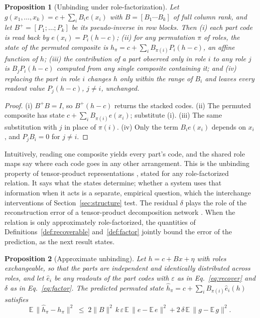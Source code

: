\documentclass[10pt]{article}
\theoremstyle{plain}
\newtheorem{proposition}{Proposition}
\theoremstyle{remark}
\begin{document}
\begin{proposition}[Unbinding under role-factorization]
\label{prop:systematic}
Let $g(x_1, \ldots, x_k) = c + \sum_i B_i e(x_i)$ with $B = [B_1 \cdots B_k]$ of full column rank, and let $B^{+} = [P_1; \ldots; P_k]$ be its pseudo-inverse in row blocks. Then (i) each part code is read back by $e(x_i) = P_i(h - c)$; (ii) for any permutation $\pi$ of roles, the state of the permuted composite is $h_\pi = c + \sum_i B_{\pi(i)} P_i (h - c)$, an affine function of $h$; (iii) the contribution of a part observed only in role $i$ to any role $j$ is $B_j P_i (h - c)$ computed from any single composite containing it; and (iv) replacing the part in role $i$ changes $h$ only within the range of $B_i$ and leaves every readout value $P_j(h - c)$, $j \ne i$, unchanged.
\end{proposition}

\begin{proof}
(i) $B^{+}B = I$, so $B^{+}(h - c)$ returns the stacked codes. (ii) The permuted composite has state $c + \sum_i B_{\pi(i)} e(x_i)$; substitute (i). (iii) The same substitution with $j$ in place of $\pi(i)$. (iv) Only the term $B_i e(x_i)$ depends on $x_i$, and $P_j B_i = 0$ for $j \neq i$.
\end{proof}

\noindent
Intuitively, reading one composite yields every part's code, and the shared role maps say where each code goes in any other arrangement. This is the unbinding property of tensor-product representations \citep{smolensky1990}, stated for any role-factorized relation. It says what the states determine; whether a system uses that information when it acts is a separate, empirical question, which the interchange interventions of Section~\ref{sec:structure} test. The residual $\delta$ plays the role of the reconstruction error of a tensor-product decomposition network \citep{mccoy2019}. When the relation is only approximately role-factorized, the quantities of Definitions~\ref{def:recoverable} and~\ref{def:factor} jointly bound the error of the prediction, as the next result states.

\begin{proposition}[Approximate unbinding]
\label{prop:approx}
Let $h = c + Bx + \eta$ with roles exchangeable, so that the parts are independent and identically distributed across roles, and let $\hat{e}_i$ be any readouts of the part codes with $\varepsilon$ as in Eq.~\eqref{eq:recover} and $\delta$ as in Eq.~\eqref{eq:factor}. The predicted permuted state $\hat{h}_\pi = c + \sum_i B_{\pi(i)}\hat{e}_i(h)$ satisfies
\begin{equation}
  \mathbb{E}\,\lVert \hat{h}_\pi - h_\pi \rVert^2 \;\le\; 2\lVert B \rVert^2\, k\,\varepsilon\, \mathbb{E}\,\lVert e - \mathbb{E}\,e \rVert^2 + 2\,\delta\, \mathbb{E}\,\lVert g - \mathbb{E}\,g \rVert^2 .
\end{equation}
\end{proposition}
\end{document}
